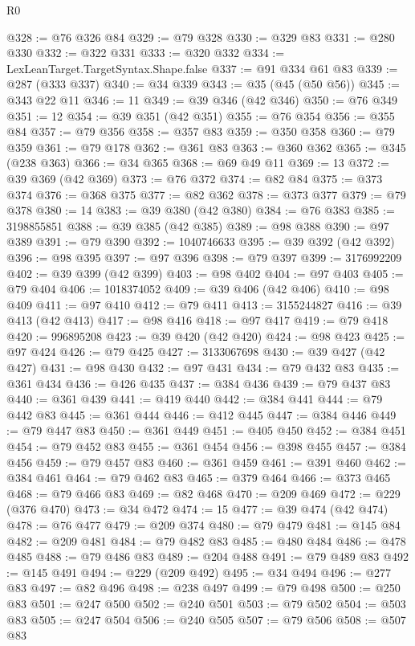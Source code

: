 \begin{lexlean}{R0}
\begin{coremodule}
@328 := @76 @326 @84
@329 := @79 @328
@330 := @329 @83
@331 := @280 @330
@332 := @322 @331
@333 := @320 @332
@334 := LexLeanTarget.TargetSyntax.Shape.false
@337 := @91 @334 @61 @83
@339 := @287 (@333 @337)
@340 := @34 @339
@343 := @35 (@45 (@50 @56))
@345 := @343 @22 @11
@346 := 11
@349 := @39 @346 (@42 @346)
@350 := @76 @349
@351 := 12
@354 := @39 @351 (@42 @351)
@355 := @76 @354
@356 := @355 @84
@357 := @79 @356
@358 := @357 @83
@359 := @350 @358
@360 := @79 @359
@361 := @79 @178
@362 := @361 @83
@363 := @360 @362
@365 := @345 (@238 @363)
@366 := @34 @365
@368 := @69 @49 @11
@369 := 13
@372 := @39 @369 (@42 @369)
@373 := @76 @372
@374 := @82 @84
@375 := @373 @374
@376 := @368 @375
@377 := @82 @362
@378 := @373 @377
@379 := @79 @378
@380 := 14
@383 := @39 @380 (@42 @380)
@384 := @76 @383
@385 := 3198855851
@388 := @39 @385 (@42 @385)
@389 := @98 @388
@390 := @97 @389
@391 := @79 @390
@392 := 1040746633
@395 := @39 @392 (@42 @392)
@396 := @98 @395
@397 := @97 @396
@398 := @79 @397
@399 := 3176992209
@402 := @39 @399 (@42 @399)
@403 := @98 @402
@404 := @97 @403
@405 := @79 @404
@406 := 1018374052
@409 := @39 @406 (@42 @406)
@410 := @98 @409
@411 := @97 @410
@412 := @79 @411
@413 := 3155244827
@416 := @39 @413 (@42 @413)
@417 := @98 @416
@418 := @97 @417
@419 := @79 @418
@420 := 996895208
@423 := @39 @420 (@42 @420)
@424 := @98 @423
@425 := @97 @424
@426 := @79 @425
@427 := 3133067698
@430 := @39 @427 (@42 @427)
@431 := @98 @430
@432 := @97 @431
@434 := @79 @432 @83
@435 := @361 @434
@436 := @426 @435
@437 := @384 @436
@439 := @79 @437 @83
@440 := @361 @439
@441 := @419 @440
@442 := @384 @441
@444 := @79 @442 @83
@445 := @361 @444
@446 := @412 @445
@447 := @384 @446
@449 := @79 @447 @83
@450 := @361 @449
@451 := @405 @450
@452 := @384 @451
@454 := @79 @452 @83
@455 := @361 @454
@456 := @398 @455
@457 := @384 @456
@459 := @79 @457 @83
@460 := @361 @459
@461 := @391 @460
@462 := @384 @461
@464 := @79 @462 @83
@465 := @379 @464
@466 := @373 @465
@468 := @79 @466 @83
@469 := @82 @468
@470 := @209 @469
@472 := @229 (@376 @470)
@473 := @34 @472
@474 := 15
@477 := @39 @474 (@42 @474)
@478 := @76 @477
@479 := @209 @374
@480 := @79 @479
@481 := @145 @84
@482 := @209 @481
@484 := @79 @482 @83
@485 := @480 @484
@486 := @478 @485
@488 := @79 @486 @83
@489 := @204 @488
@491 := @79 @489 @83
@492 := @145 @491
@494 := @229 (@209 @492)
@495 := @34 @494
@496 := @277 @83
@497 := @82 @496
@498 := @238 @497
@499 := @79 @498
@500 := @250 @83
@501 := @247 @500
@502 := @240 @501
@503 := @79 @502
@504 := @503 @83
@505 := @247 @504
@506 := @240 @505
@507 := @79 @506
@508 := @507 @83

\end{coremodule}
\end{lexlean}
